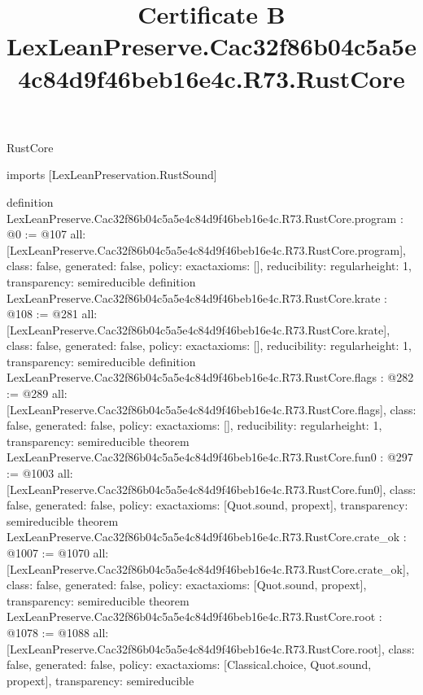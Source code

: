 \begin{lexlean}{RustCore}
\title{Certificate B LexLeanPreserve.Cac32f86b04c5a5e4c84d9f46beb16e4c.R73.RustCore}
\begin{coremodule}
imports [LexLeanPreservation.RustSound]

definition LexLeanPreserve.Cac32f86b04c5a5e4c84d9f46beb16e4c.R73.RustCore.program : @0 := @107 {
  all: [LexLeanPreserve.Cac32f86b04c5a5e4c84d9f46beb16e4c.R73.RustCore.program],
  class: false,
  generated: false,
  policy: exact{axioms: []},
  reducibility: regular{height: 1},
  transparency: semireducible
}
definition LexLeanPreserve.Cac32f86b04c5a5e4c84d9f46beb16e4c.R73.RustCore.krate : @108 := @281 {
  all: [LexLeanPreserve.Cac32f86b04c5a5e4c84d9f46beb16e4c.R73.RustCore.krate],
  class: false,
  generated: false,
  policy: exact{axioms: []},
  reducibility: regular{height: 1},
  transparency: semireducible
}
definition LexLeanPreserve.Cac32f86b04c5a5e4c84d9f46beb16e4c.R73.RustCore.flags : @282 := @289 {
  all: [LexLeanPreserve.Cac32f86b04c5a5e4c84d9f46beb16e4c.R73.RustCore.flags],
  class: false,
  generated: false,
  policy: exact{axioms: []},
  reducibility: regular{height: 1},
  transparency: semireducible
}
theorem LexLeanPreserve.Cac32f86b04c5a5e4c84d9f46beb16e4c.R73.RustCore.fun0 : @297 := @1003 {
  all: [LexLeanPreserve.Cac32f86b04c5a5e4c84d9f46beb16e4c.R73.RustCore.fun0],
  class: false,
  generated: false,
  policy: exact{axioms: [Quot.sound, propext]},
  transparency: semireducible
}
theorem LexLeanPreserve.Cac32f86b04c5a5e4c84d9f46beb16e4c.R73.RustCore.crate_ok : @1007 := @1070 {
  all: [LexLeanPreserve.Cac32f86b04c5a5e4c84d9f46beb16e4c.R73.RustCore.crate_ok],
  class: false,
  generated: false,
  policy: exact{axioms: [Quot.sound, propext]},
  transparency: semireducible
}
theorem LexLeanPreserve.Cac32f86b04c5a5e4c84d9f46beb16e4c.R73.RustCore.root : @1078 := @1088 {
  all: [LexLeanPreserve.Cac32f86b04c5a5e4c84d9f46beb16e4c.R73.RustCore.root],
  class: false,
  generated: false,
  policy: exact{axioms: [Classical.choice, Quot.sound, propext]},
  transparency: semireducible
}


\end{coremodule}
\end{lexlean}
